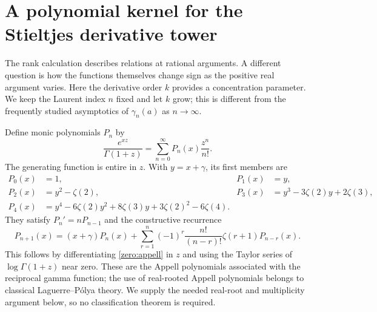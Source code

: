 \section{A polynomial kernel for the Stieltjes derivative tower}
\label{zero:section}

The rank calculation describes relations at rational arguments.  A different
question is how the functions themselves change sign as the positive real
argument varies.  Here the derivative order $k$ provides a concentration
parameter.  We keep the Laurent index $n$ fixed and let $k$ grow; this is
different from the frequently studied asymptotics of $\gamma_n(a)$ as
$n\to\infty$.

Define monic polynomials $P_n$ by
\begin{equation}\label{zero:appell}
 \frac{e^{xz}}{\Gamma(1+z)}
   =\sum_{n=0}^{\infty}P_n(x)\frac{z^n}{n!}.
\end{equation}
The generating function is entire in $z$.  With $y=x+\gamma$, its first
members are
\begin{align*}
 P_0(x)&=1, & P_1(x)&=y,\\
 P_2(x)&=y^2-\zeta(2),&
 P_3(x)&=y^3-3\zeta(2)y+2\zeta(3),\\
 P_4(x)&=y^4-6\zeta(2)y^2+8\zeta(3)y
                       +3\zeta(2)^2-6\zeta(4).
\end{align*}
They satisfy $P_n'=nP_{n-1}$ and the constructive recurrence
\begin{equation}\label{zero:recurrence}
 P_{n+1}(x)=(x+\gamma)P_n(x)
       +\sum_{r=1}^{n}(-1)^r\frac{n!}{(n-r)!}\zeta(r+1)P_{n-r}(x).
\end{equation}
This follows by differentiating \eqref{zero:appell} in $z$ and using the
Taylor series of $\log\Gamma(1+z)$ near zero.  These are the Appell
polynomials associated with the reciprocal gamma function; the use of
real-rooted Appell polynomials belongs to classical Laguerre--P\'olya
theory.  We supply the needed real-root and multiplicity argument below,
so no classification theorem is required.

